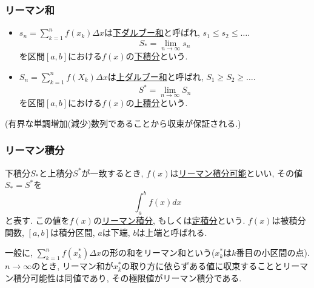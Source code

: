 

\begin{frame}
\frametitle{リーマン和}

\begin{itemize}
\item $s_n=\sum_{k=1}^nf(x_k)\Delta x$は\underline{下ダルブー和}と呼ばれ, $s_1 \le s_2 \le \dots$. 
$$S_*=\lim_{n \to \infty} s_n$$
を区間$[a,b]$における$f(x)$の\underline{下積分}という. 
\item $S_n=\sum_{k=1}^nf(X_k)\Delta x$は\underline{上ダルブー和}と呼ばれ, $S_1 \ge S_2 \ge \dots$. 
$$S^*=\lim_{n \to \infty} S_n$$
を区間$[a,b]$における$f(x)$の\underline{上積分}という. 
\end{itemize}
(有界な単調増加(減少)数列であることから収束が保証される.)

\end{frame}





\begin{frame}
\frametitle{リーマン積分}


\begin{Def}
下積分$S_*$と上積分$S^*$が一致するとき, $f(x)$は\underline{リーマン積分可能}といい, その値$S_*=S^*$を
$$
\int_a^b f(x)dx
$$
と表す. この値を$f(x)$の\underline{リーマン積分}, もしくは\underline{定積分}という. 
$f(x)$は被積分関数, $[a,b]$は積分区間, $a$は下端, $b$は上端と呼ばれる. 
\end{Def}

一般に, $\sum_{k=1}^nf(x_k^*)\Delta x$の形の和をリーマン和という($x_k^*$は$k$番目の小区間の点). 
$n \to \infty$のとき, リーマン和が$x_k^*$の取り方に依らずある値に収束することとリーマン積分可能性は同値であり, 
その極限値がリーマン積分である.  

\end{frame}




